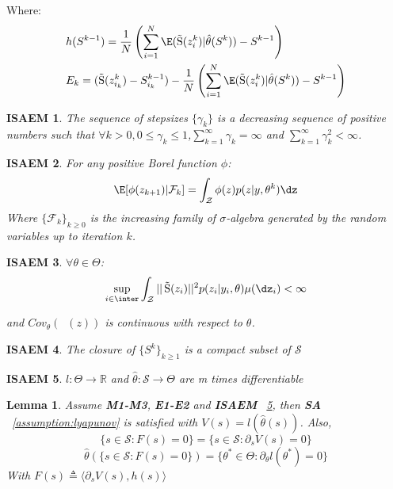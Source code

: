 \documentclass[a4paper]{article}
\theoremstyle{plain}
\newtheorem{lemma}{Lemma}
\newtheorem{assumption_saem}{ISAEM}
\DeclareMathOperator*{\St}{\tilde{S}}
\theoremstyle{plain}
\theoremstyle{definition}
\begin{document}
Where:
\begin{equation}
\begin{split}
& h(S^{k-1}) = \frac{1}{N}\left(\sum_{i=1}^{N}{\E(\St(z_i^k)|\hat{\theta}(S^k))} - S^{k-1}\right)\\
& E_k = (\St(z_{i_k}^k)-S_{i_k}^{k-1}) - \frac{1}{N}\left(\sum_{i=1}^{N}{\E(\St(z_i^k)|\hat{\theta}(S^k))} - S^{k-1}\right)
\end{split}
\end{equation}

\begin{assumption_saem}
The sequence of stepsizes $\{\gamma_k\}$ is a decreasing sequence of positive numbers such that $\forall k >0, 0 \leq \gamma_k \leq 1$,$\sum_{k=1}^{\infty}{\gamma_k} = \infty$ and $\sum_{k=1}^{\infty}{\gamma_k^2} < \infty$.
\end{assumption_saem}
\begin{assumption_saem}
For any positive Borel function $\phi$:
\begin{equation}
\E [\phi(z_{k+1})|\mathcal{F}_k] = \int_{\mathcal{Z}}{\phi(z)p(z|y,\theta^k)}\dz
\end{equation}
Where $\{\mathcal{F}_k\}_{k\geq 0}$ is the increasing family of $\sigma$-algebra generated by the random variables up to iteration $k$.
\end{assumption_saem}

\begin{assumption_saem}
$\forall \theta \in \Theta$:
\begin{equation}
\sup \limits_{i \in \inter} \int_{\mathcal{Z}}{||\St(z_i)||^2p(z_i|y_i,\theta})\mu(\dz_i) < \infty
\end{equation}

and $Cov_{\theta}(\St(z))$ is continuous with respect to $\theta$.
\end{assumption_saem}

\begin{assumption_saem}
The closure of $\{S^k\}_{k \geq 1}$ is a compact subset of $\mathcal{S}$
\end{assumption_saem}

\begin{assumption_saem}\label{differentiable}
$l:\Theta \to \mathbb{R}$ and $\hat{\theta}:\mathcal{S} \to \Theta$ are m times differentiable
\end{assumption_saem}

\begin{lemma}\label{lemma_lypaunov}
Assume {\normalfont \textbf{M1-M3}}, {\normalfont \textbf{E1-E2}} and \textbf{ISAEM} ~\ref{differentiable}, then \textbf{SA} ~\ref{assumption:lyapunov} is satisfied with $V(s) = l(\hat{\theta}(s))$. Also,
\begin{equation}
\{s \in \mathcal{S}: F(s) = 0\} = \{s \in \mathcal{S}: \partial_{s}V(s) = 0\}
\end{equation}
\begin{equation}
\hat{\theta}(\{s \in \mathcal{S}: F(s) = 0\}) = \{\theta^* \in \Theta: \partial_{\theta}l(\theta^*) = 0\}
\end{equation}
With $F(s) \triangleq \langle \partial_{s}V(s), h(s) \rangle$
\end{lemma}
\end{document}
